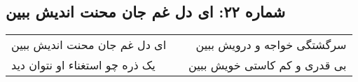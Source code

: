 \begin{center}
\section*{شماره ۲۲: ای دل غم جان محنت اندیش ببین}
\label{sec:022}
\begin{longtable}{l p{0.5cm} r}
ای دل غم جان محنت اندیش ببین
&&
سرگشتگی خواجه و درویش ببین
\\
یک ذره چو استغناء او نتوان دید
&&
بی قدری و کم کاستی خویش ببین
\\
\end{longtable}
\end{center}
